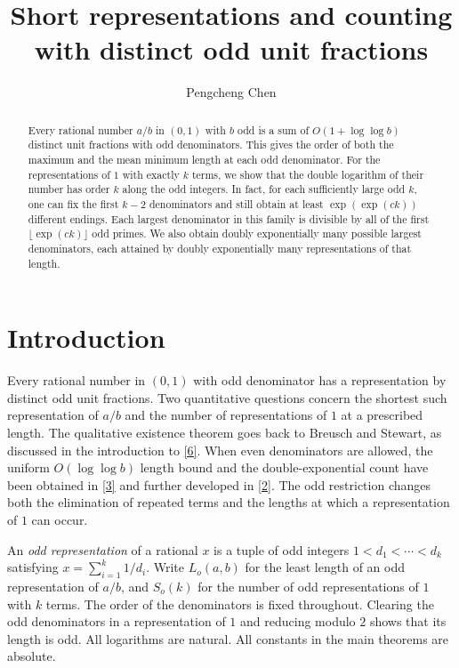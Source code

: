 \documentclass[11pt,a4paper]{article}
\title{Short representations and counting with distinct odd unit fractions}
\author{Pengcheng Chen}
\date{}
\begin{document}
\maketitle

\begin{abstract}
Every rational number $a/b$ in $(0,1)$ with $b$ odd is a sum of $O(1+\log\log b)$ distinct unit fractions with odd denominators. This gives the order of both the maximum and the mean minimum length at each odd denominator. For the representations of $1$ with exactly $k$ terms, we show that the double logarithm of their number has order $k$ along the odd integers. In fact, for each sufficiently large odd $k$, one can fix the first $k-2$ denominators and still obtain at least $\exp(\exp(ck))$ different endings. Each largest denominator in this family is divisible by all of the first $\lfloor\exp(ck)\rfloor$ odd primes. We also obtain doubly exponentially many possible largest denominators, each attained by doubly exponentially many representations of that length.
\end{abstract}

\section{Introduction}

Every rational number in $(0,1)$ with odd denominator has a representation by distinct odd unit fractions. Two quantitative questions concern the shortest such representation of $a/b$ and the number of representations of $1$ at a prescribed length. The qualitative existence theorem goes back to Breusch and Stewart, as discussed in the introduction to \hyperlink{ref-6}{[6]}. When even denominators are allowed, the uniform $O(\log\log b)$ length bound and the double-exponential count have been obtained in \hyperlink{ref-3}{[3]} and further developed in \hyperlink{ref-2}{[2]}. The odd restriction changes both the elimination of repeated terms and the lengths at which a representation of $1$ can occur.

An \emph{odd representation} of a rational $x$ is a tuple of odd integers $1<d_1<\cdots<d_k$ satisfying $x=\sum_{i=1}^k 1/d_i$. Write $L_o(a,b)$ for the least length of an odd representation of $a/b$, and $S_o(k)$ for the number of odd representations of $1$ with $k$ terms. The order of the denominators is fixed throughout. Clearing the odd denominators in a representation of $1$ and reducing modulo $2$ shows that its length is odd. All logarithms are natural. All constants in the main theorems are absolute.
\end{document}
